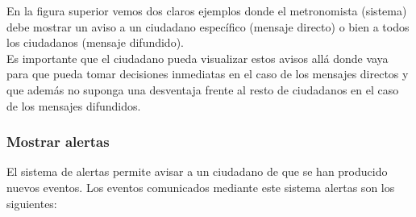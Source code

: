 En la figura superior vemos dos claros ejemplos donde el metronomista (sistema) debe mostrar un aviso a un ciudadano específico (mensaje directo) o bien a todos los ciudadanos (mensaje difundido).\\

Es importante que el ciudadano pueda visualizar estos avisos allá donde vaya para que pueda tomar decisiones inmediatas en el caso de los mensajes directos y que además no suponga una desventaja frente al resto de ciudadanos en el caso de los mensajes difundidos.

\subsubsection{Mostrar alertas}

El sistema de alertas permite avisar a un ciudadano de que se han producido nuevos eventos. Los eventos comunicados mediante este sistema alertas son los siguientes:\\

